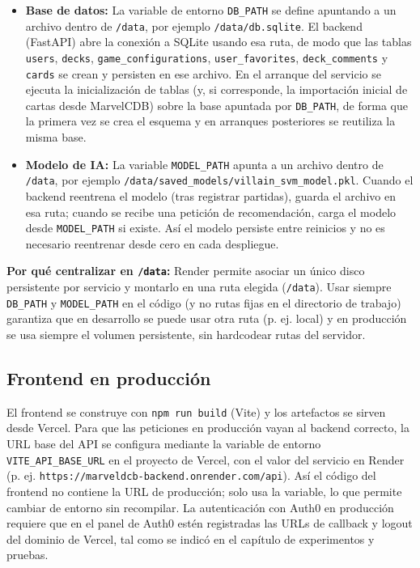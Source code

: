 \begin{itemize}
    \item \textbf{Base de datos:} La variable de entorno \texttt{DB\_PATH} se define apuntando a un archivo dentro de \texttt{/data}, por ejemplo \texttt{/data/db.sqlite}. El backend (FastAPI) abre la conexión a SQLite usando esa ruta, de modo que las tablas \texttt{users}, \texttt{decks}, \texttt{game\_configurations}, \texttt{user\_favorites}, \texttt{deck\_comments} y \texttt{cards} se crean y persisten en ese archivo. En el arranque del servicio se ejecuta la inicialización de tablas (y, si corresponde, la importación inicial de cartas desde MarvelCDB) sobre la base apuntada por \texttt{DB\_PATH}, de forma que la primera vez se crea el esquema y en arranques posteriores se reutiliza la misma base.
    \item \textbf{Modelo de IA:} La variable \texttt{MODEL\_PATH} apunta a un archivo dentro de \texttt{/data}, por ejemplo \texttt{/data/saved\_models/villain\_svm\_model.pkl}. Cuando el backend reentrena el modelo (tras registrar partidas), guarda el archivo en esa ruta; cuando se recibe una petición de recomendación, carga el modelo desde \texttt{MODEL\_PATH} si existe. Así el modelo persiste entre reinicios y no es necesario reentrenar desde cero en cada despliegue.
\end{itemize}

\textbf{Por qué centralizar en \texttt{/data}:} Render permite asociar un único disco persistente por servicio y montarlo en una ruta elegida (\texttt{/data}). Usar siempre \texttt{DB\_PATH} y \texttt{MODEL\_PATH} en el código (y no rutas fijas en el directorio de trabajo) garantiza que en desarrollo se puede usar otra ruta (p. ej. local) y en producción se usa siempre el volumen persistente, sin hardcodear rutas del servidor.

\subsection{Frontend en producción}

El frontend se construye con \texttt{npm run build} (Vite) y los artefactos se sirven desde Vercel. Para que las peticiones en producción vayan al backend correcto, la URL base del API se configura mediante la variable de entorno \texttt{VITE\_API\_BASE\_URL} en el proyecto de Vercel, con el valor del servicio en Render (p. ej. \texttt{https://marveldcb-backend.onrender.com/api}). Así el código del frontend no contiene la URL de producción; solo usa la variable, lo que permite cambiar de entorno sin recompilar. La autenticación con Auth0 en producción requiere que en el panel de Auth0 estén registradas las URLs de callback y logout del dominio de Vercel, tal como se indicó en el capítulo de experimentos y pruebas.

